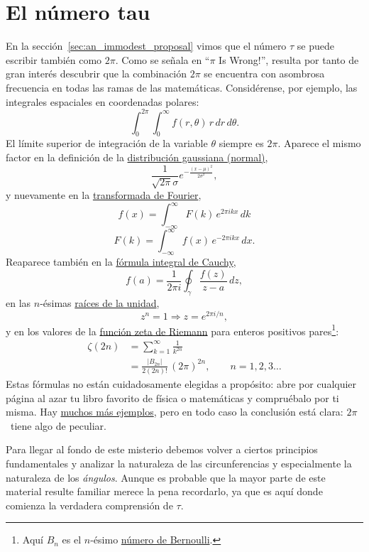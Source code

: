 
\section{El número tau} %
\label{sec:the_number_tau}

En la sección~\ref{sec:an_immodest_proposal} vimos que el número $\tau$ se puede escribir también como $2\pi$. Como se señala en ``$\pi$ Is Wrong!'', resulta por tanto de gran interés descubrir que la combinación $2\pi$ se encuentra con asombrosa frecuencia en todas las ramas de las matemáticas. Considérense, por ejemplo, las integrales espaciales en coordenadas polares:
\[
  \int_0^{2\pi}\int_0^\infty f(r, \theta)\, r\, dr\, d\theta.
\]
El límite superior de integración de la variable $\theta$ siempre es $2\pi$. Aparece el mismo factor en la definición de la \href{https://es.wikipedia.org/wiki/Distribución_normal}{distribución gaussiana (normal)},
\[
  \frac{1}{\sqrt{2\pi}\sigma}e^{-\frac{(x-\mu)^2}{2\sigma^2}},
\]
y nuevamente en la  \href{http://mathworld.wolfram.com/FourierTransform.html}{transformada de Fourier},
\[
  f(x) = \int_{-\infty}^\infty F(k)\, e^{2\pi ikx}\,dk
\]
\[
    F(k) = \int_{-\infty}^\infty f(x)\, e^{-2\pi ikx}\,dx.
\]
Reaparece también en la \href{https://es.wikipedia.org/wiki/Fórmula_integral_de_Cauchy}{fórmula integral de Cauchy},
\[
  f(a) = \frac{1}{2\pi i}\oint_\gamma\frac{f(z)}{z-a}\,dz,
\]
en las $n$-ésimas \href{https://es.wikipedia.org/wiki/Raíz_de_la_unidad}{raíces de la unidad},
\[
  z^n = 1 \Rightarrow z = e^{2\pi i/n},
\]
y en los valores de la \href{https://es.wikipedia.org/wiki/Función_zeta_de_Riemann}{función zeta de Riemann} para enteros positivos pares\footnote{Aquí $B_n$ es el $n$-ésimo \href{https://es.wikipedia.org/wiki/Número_de_Bernoulli}{número de Bernoulli}.}:
\[
\begin{split}
  \zeta(2n) & = \sum_{k=1}^\infty \frac{1}{k^{2n}} \\
            & = \frac{|B_{2n}|}{2(2n)!}\,(2\pi)^{2n},\qquad n = 1, 2, 3\ldots
\end{split}
\]
Estas fórmulas no están cuidadosamente elegidas a propósito: abre por cualquier página al azar tu libro favorito de física o matemáticas y compruébalo por ti misma. Hay \href{http://www.harremoes.dk/Peter/Undervis/Turnpage/Turnpage1.html}{muchos más ejemplos}, pero en todo caso la conclusión está clara: $2\pi$~tiene algo de peculiar.

Para llegar al fondo de este misterio debemos volver a ciertos principios fundamentales y analizar la naturaleza de las circunferencias y especialmente la naturaleza de los \emph{ángulos}. Aunque es probable que la mayor parte de este material resulte familiar merece la pena recordarlo, ya que es aquí donde comienza la verdadera comprensión de $\tau$.

